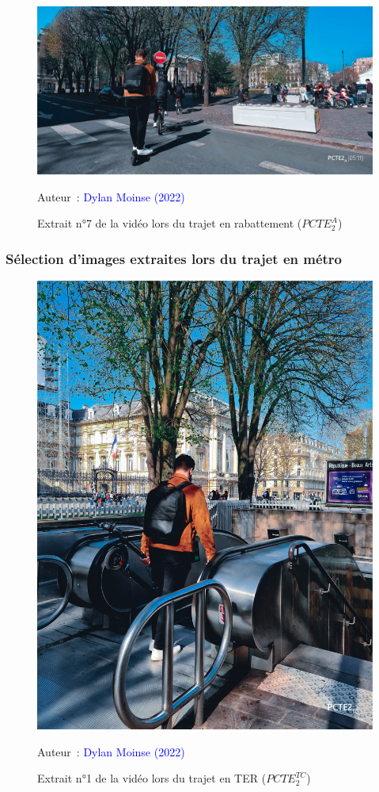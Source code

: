     \begin{figure}[h!]\vspace*{4pt}
        \caption*{Extrait n°7 de la vidéo lors du trajet en rabattement (\(PCTE^{A}_{2}\))}
        \centerline{\includegraphics[width=0.75\columnwidth]{src/Figures/Annexes/Extrait_Video_PCTE2_Access_7.jpg}}
        \vspace{5pt}
        \begin{flushright}\scriptsize{
        Auteur~: \textcolor{blue}{Dylan Moinse (2022)}
        }\end{flushright}
    \end{figure}

\subsubsection{Sélection d'images extraites lors du trajet en métro}

    \begin{figure}[h!]\vspace*{4pt}
        \caption*{Extrait n°1 de la vidéo lors du trajet en TER (\(PCTE^{TC}_{2}\))}
        \centerline{\includegraphics[width=0.5\columnwidth]{src/Figures/Annexes/Extrait_Video_PCTE2_TC_1.jpg}}
        \vspace{5pt}
        \begin{flushright}\scriptsize{
        Auteur~: \textcolor{blue}{Dylan Moinse (2022)}
        }\end{flushright}
    \end{figure}

